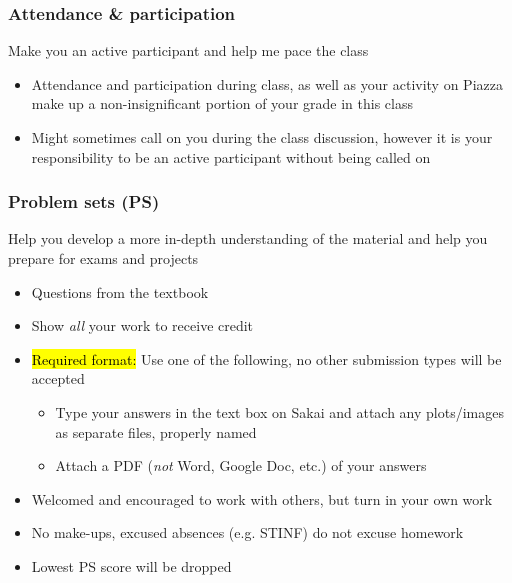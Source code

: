 \documentclass[slidestop,compress,mathserif,12pt,t,professionalfonts,xcolor=table]{beamer}
\begin{document}

\begin{frame}
\frametitle{Attendance \& participation}

 Make you an active participant and help me pace the class 

\begin{itemize}

\item Attendance and participation during class, as well as your activity on Piazza make up a non-insignificant portion of your grade in this class

\item Might sometimes call on you during the class discussion, however it is your responsibility to be an active participant without being called on

\end{itemize}

\end{frame}


\begin{frame}
\frametitle{Problem sets (PS)}

 Help you develop a more in-depth understanding of the material and help you prepare for exams and projects

\begin{itemize}

\item Questions from the textbook

\item Show \emph{all} your work to receive credit

\item \hl{Required format:} Use one of the following, no other submission types will be accepted
\begin{itemize}
\item Type your answers in the text box on Sakai and attach any plots/images as separate files, properly named
\item Attach a PDF (\emph{not} Word, Google Doc, etc.) of your answers
\end{itemize}

\item Welcomed and encouraged to work with others, but turn in your own work

\item No make-ups, excused absences (e.g. STINF) do not excuse homework

\item Lowest PS score will be dropped

\end{itemize}

\end{frame}
\end{document}
